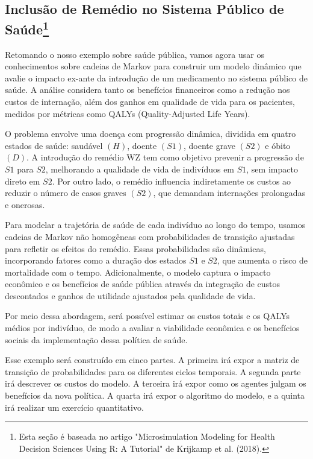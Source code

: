 \documentclass[12pt]{article}
\theoremstyle{break}
\begin{document}
\subsection{Inclusão de Remédio no Sistema Público de Saúde\footnote{Esta seção é baseada no artigo "Microsimulation Modeling for Health Decision Sciences Using R: A Tutorial" de Krijkamp et al. (2018).}}



Retomando o nosso exemplo sobre saúde pública, vamos agora usar os conhecimentos sobre cadeias de Markov para construir um modelo dinâmico que avalie o impacto ex-ante da introdução de um medicamento no sistema público de saúde. A análise considera tanto os benefícios financeiros como a redução nos custos de internação, além dos ganhos em qualidade de vida para os pacientes, medidos por métricas como QALYs (Quality-Adjusted Life Years).

O problema envolve uma doença com progressão dinâmica, dividida em quatro estados de saúde: saudável $(H)$, doente $(S1)$, doente grave $(S2)$ e óbito $(D)$. A introdução do remédio WZ tem como objetivo prevenir a progressão de  $S1$ para  $S2$, melhorando a qualidade de vida de indivíduos em  $S1$, sem impacto direto em  $S2$. Por outro lado, o remédio influencia indiretamente os custos ao reduzir o número de casos graves $(S2)$, que demandam internações prolongadas e onerosas.

Para modelar a trajetória de saúde de cada indivíduo ao longo do tempo, usamos cadeias de Markov não homogêneas com probabilidades de transição ajustadas para refletir os efeitos do remédio. Essas probabilidades são dinâmicas, incorporando fatores como a duração dos estados $S1$ e $S2$, que aumenta o risco de mortalidade com o tempo. Adicionalmente, o modelo captura o impacto econômico e os benefícios de saúde pública através da integração de custos descontados e ganhos de utilidade ajustados pela qualidade de vida.

Por meio dessa abordagem, será possível estimar os custos totais e os QALYs médios por indivíduo, de modo a avaliar a viabilidade econômica e os benefícios sociais da implementação dessa política de saúde.

Esse exemplo será construído em cinco partes. A primeira irá expor a matriz de transição de probabilidades para os diferentes ciclos temporais. A segunda parte irá descrever os custos do modelo. A terceira irá expor  como os agentes julgam os benefícios da nova política. A quarta irá expor o algoritmo do modelo, e a quinta irá realizar um exercício quantitativo.
\end{document}
